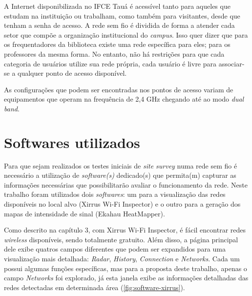 A Internet disponibilizada no IFCE Tauá é acessível tanto para aqueles que estudam na instituição ou trabalham, como também para visitantes, desde que tenham a senha de acesso. A rede sem fio é dividida de forma a atender cada setor que compõe a organização institucional do \textit{campus}. Isso quer dizer que para os frequentadores da biblioteca existe uma rede específica para eles; para os professores da mesma forma. No entanto, não há restrições para que cada categoria de usuários utilize sua rede própria, cada usuário é livre para associar-se a qualquer ponto de acesso disponível.

As configurações que podem ser encontradas nos pontos de acesso variam de equipamentos que operam na frequência de 2,4 GHz chegando até ao modo \textit{dual band}.

\section{Softwares utilizados}
\label{sec:softwares-utiliados}

Para que sejam realizados os testes iniciais de \textit{site survey} numa rede sem fio é necessário a utilização de \textit{software(s)} dedicado(s) que permita(m) capturar as informações necessárias que possibilitarão avaliar o funcionamento da rede. Neste trabalho foram utilizados dois \textit{softwares}: um para a visualização das redes disponíveis no local alvo (Xirrus Wi-Fi Inspector) e o outro para a geração dos mapas de intensidade de sinal (Ekahau HeatMapper).

Como descrito na capítulo 3, com Xirrus Wi-Fi Inspector, é fácil encontrar redes \textit{wireless} disponíveis, sendo totalmente gratuito. Além disso, a página principal dele exibe quatros campos diferentes que podem ser expandidos para uma visualização mais detalhada: \textit{Radar}, \textit{History}, \textit{Connection} e \textit{Networks}. Cada um possui algumas funções específicas, mas para a proposta deste trabalho, apenas o campo \textit{Networks} foi explorado, já esta janela exibe as informações detalhadas das redes detectadas em determinada área (\autoref{fig:software-xirrus}).

\begin{figure}[H]
	\centering
\end{figure}

